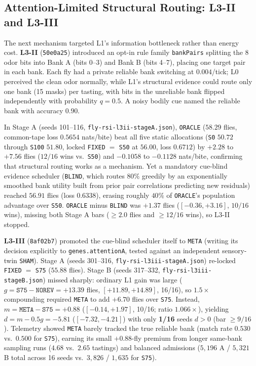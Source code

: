 \subsection{Attention-Limited Structural Routing: L3-II and L3-III}

The next mechanism targeted L1's information bottleneck rather than energy cost. \textbf{L3-II} (\texttt{50e0a25}) introduced an opt-in rule family \texttt{bankPairs} splitting the 8 odor bits into Bank A (bits 0--3) and Bank B (bits 4--7), placing one target pair in each bank. Each fly had a private reliable bank switching at $0.004$/tick; L0 perceived the clean odor normally, while L1's structural evidence could route only one bank (15 masks) per tasting, with bits in the unreliable bank flipped independently with probability $q=0.5$. A noisy bodily cue named the reliable bank with accuracy $0.90$.

In Stage A (seeds 101--116, \texttt{fly-rsi-l3ii-stageA.json}), \texttt{ORACLE} ($58.29$ flies, common-tape loss $0.5654$ nats/bite) beat all five static allocations (\texttt{S0} $50.72$ through \texttt{S100} $51.80$, locked \texttt{FIXED} $=$ \texttt{S50} at $56.00$, loss $0.6712$) by $+2.28$ to $+7.56$ flies ($12/16$ wins vs.\ \texttt{S50}) and $-0.1058$ to $-0.1128$ nats/bite, confirming that structural routing works as a mechanism. Yet a mandatory cue-blind evidence scheduler (\texttt{BLIND}, which routes $80\%$ greedily by an exponentially smoothed bank utility built from prior pair correlations predicting new residuals) reached $56.91$ flies (loss $0.6338$), erasing roughly $40\%$ of \texttt{ORACLE}'s population advantage over \texttt{S50}. \texttt{ORACLE} minus \texttt{BLIND} was $+1.37$ flies ($[-0.36,+3.16]$, $10/16$ wins), missing both Stage A bars ($\ge 2.0$ flies and $\ge 12/16$ wins), so L3-II stopped.

\textbf{L3-III} (\texttt{8af02b7}) promoted the cue-blind scheduler itself to \texttt{META} (writing its decision explicitly to \texttt{genes.attentionA}, tested against an independent sensory-twin \texttt{SHAM}). Stage A (seeds 301--316, \texttt{fly-rsi-l3iii-stageA.json}) re-locked \texttt{FIXED} $=$ \texttt{S75} ($55.88$ flies). Stage B (seeds 317--332, \texttt{fly-rsi-l3iii-stageB.json}) missed sharply: ordinary L1 gain was large ($g = \texttt{S75} - \texttt{NOREV} = +13.39$ flies, $[+11.89,+14.89]$, 16/16), so $1.5\times$ compounding required \texttt{META} to add $+6.70$ flies over \texttt{S75}. Instead, $m = \texttt{META} - \texttt{S75} = +0.88$ ($[-0.14,+1.97]$, 10/16; ratio $1.066\times$), yielding $d = m - 0.5g = -5.81$ ($[-7.32,-4.21]$) with only \textbf{1/16} seeds $d > 0$ (bar $\ge 9/16$). Telemetry showed \texttt{META} barely tracked the true reliable bank (match rate $0.530$ vs.\ $0.500$ for \texttt{S75}), earning its small $+0.88$-fly premium from longer same-bank sampling runs ($4.68$ vs.\ $2.65$ tastings) and balanced admissions ($5{,}196$ A / $5{,}321$ B total across 16 seeds vs.\ $3{,}826$ / $1{,}635$ for \texttt{S75}).

